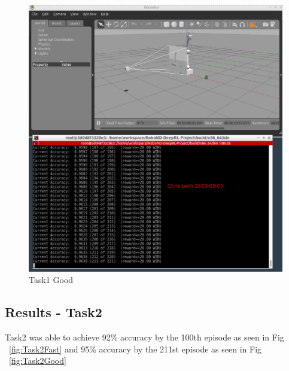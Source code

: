 \documentclass[10pt]{article}
\begin{document}
\begin{figure}[p]
      \centering
      \includegraphics[width=\linewidth]{Assets/Task1_96at236_2019-03-05_08-45-06.png}
      \caption{Task1 Good}
      \label{fig:Task1Good}
\end{figure}

\subsection{Results - Task2}
Task2 was able to achieve 92\% accuracy by the 100th episode as seen in Fig ~\ref{fig:Task2Fast} 
and 95\% accuracy by the 211st episode as seen in Fig ~\ref{fig:Task2Good} 
\end{document}
